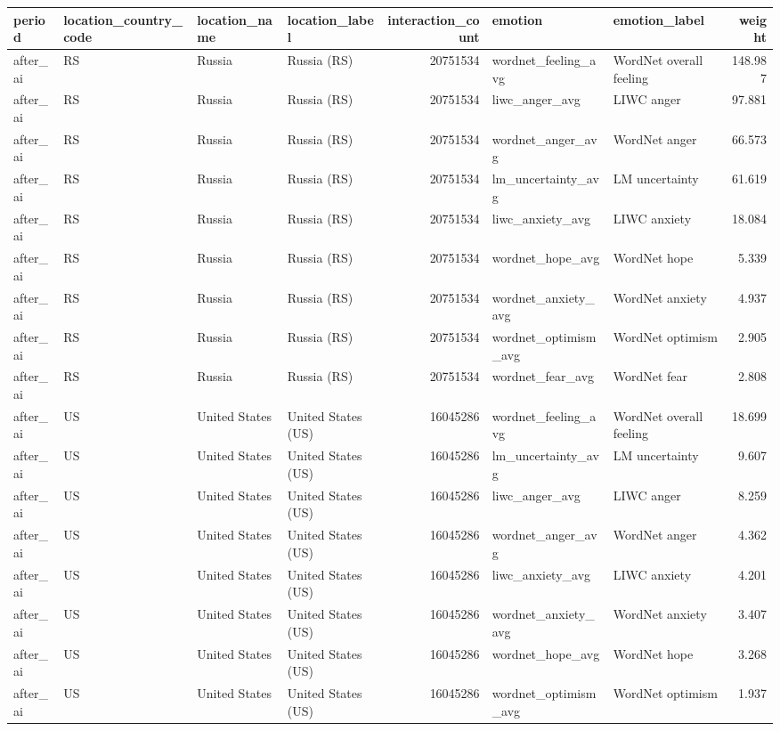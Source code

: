 \begin{tabular}{llllrllr}
\toprule
period & location\_country\_code & location\_name & location\_label & interaction\_count & emotion & emotion\_label & weight \\
\midrule
after\_ai & RS & Russia & Russia (RS) & 20751534 & wordnet\_feeling\_avg & WordNet overall feeling & 148.987 \\
after\_ai & RS & Russia & Russia (RS) & 20751534 & liwc\_anger\_avg & LIWC anger & 97.881 \\
after\_ai & RS & Russia & Russia (RS) & 20751534 & wordnet\_anger\_avg & WordNet anger & 66.573 \\
after\_ai & RS & Russia & Russia (RS) & 20751534 & lm\_uncertainty\_avg & LM uncertainty & 61.619 \\
after\_ai & RS & Russia & Russia (RS) & 20751534 & liwc\_anxiety\_avg & LIWC anxiety & 18.084 \\
after\_ai & RS & Russia & Russia (RS) & 20751534 & wordnet\_hope\_avg & WordNet hope & 5.339 \\
after\_ai & RS & Russia & Russia (RS) & 20751534 & wordnet\_anxiety\_avg & WordNet anxiety & 4.937 \\
after\_ai & RS & Russia & Russia (RS) & 20751534 & wordnet\_optimism\_avg & WordNet optimism & 2.905 \\
after\_ai & RS & Russia & Russia (RS) & 20751534 & wordnet\_fear\_avg & WordNet fear & 2.808 \\
after\_ai & US & United States & United States (US) & 16045286 & wordnet\_feeling\_avg & WordNet overall feeling & 18.699 \\
after\_ai & US & United States & United States (US) & 16045286 & lm\_uncertainty\_avg & LM uncertainty & 9.607 \\
after\_ai & US & United States & United States (US) & 16045286 & liwc\_anger\_avg & LIWC anger & 8.259 \\
after\_ai & US & United States & United States (US) & 16045286 & wordnet\_anger\_avg & WordNet anger & 4.362 \\
after\_ai & US & United States & United States (US) & 16045286 & liwc\_anxiety\_avg & LIWC anxiety & 4.201 \\
after\_ai & US & United States & United States (US) & 16045286 & wordnet\_anxiety\_avg & WordNet anxiety & 3.407 \\
after\_ai & US & United States & United States (US) & 16045286 & wordnet\_hope\_avg & WordNet hope & 3.268 \\
after\_ai & US & United States & United States (US) & 16045286 & wordnet\_optimism\_avg & WordNet optimism & 1.937 \\

\end{tabular}
